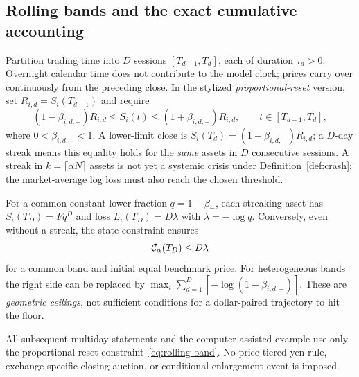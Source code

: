 \documentclass[review,hidelinks,onefignum,onetabnum]{siamonline250211}
\begin{document}
\subsection{Rolling bands and the exact cumulative accounting}\label{subsec:multiday-protocol}
Partition trading time into $D$ sessions $[T_{d-1},T_d]$, each of duration $\tau_d>0$. Overnight calendar time does not contribute to the model clock; prices carry over continuously from the preceding close. In the stylized \emph{proportional-reset} version, set $R_{i,d}=S_i(T_{d-1})$ and require
\begin{equation}\label{eq:rolling-band}
 (1-\beta_{i,d,-})R_{i,d}\le S_i(t)\le(1+\beta_{i,d,+})R_{i,d},
 \qquad t\in[T_{d-1},T_d],
\end{equation}
where $0<\beta_{i,d,-}<1$. A lower-limit close is
$S_i(T_d)=(1-\beta_{i,d,-})R_{i,d}$; a $D$-day streak means this equality holds for the \emph{same} assets in $D$ consecutive sessions. A streak in $k=\lceil\alpha N\rceil$ assets is not yet a systemic crisis under Definition~\ref{def:crash}: the market-average log loss must also reach the chosen threshold.

For a common constant lower fraction $q=1-\beta_-$, each streaking asset has
$S_i(T_D)=Fq^D$ and loss $L_i(T_D)=D\lambda$ with $\lambda=-\log q$. Conversely, even without a streak, the state constraint ensures
\begin{equation}\label{eq:rolling-cumulative-upper}
  \mathcal{C}_\alpha(T_D)\le D\lambda
\end{equation}
for a common band and initial equal benchmark price. For heterogeneous bands the right side can be replaced by
$\max_i\sum_{d=1}^D[-\log(1-\beta_{i,d,-})]$. These are \emph{geometric ceilings}, not sufficient conditions for a dollar-paired trajectory to hit the floor.

All subsequent multiday statements and the computer-assisted example use only the proportional-reset constraint~\eqref{eq:rolling-band}. No price-tiered yen rule, exchange-specific closing auction, or conditional enlargement event is imposed.
\end{document}
